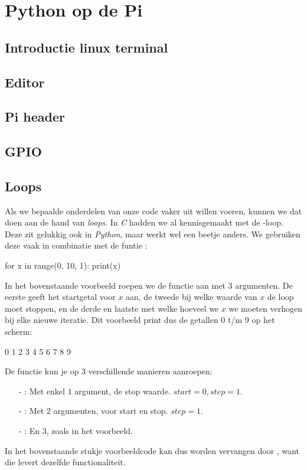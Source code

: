 \chapter{Python op de Pi}

\section{Introductie linux terminal}

\section{Editor}

\section{Pi header}

\section{GPIO}

\section{Loops}
Als we bepaalde onderdelen van onze code vaker uit willen voeren, kunnen we dat doen aan de hand van \textit{loops}. In \textit{C} hadden we al kennisgemaakt met de -loop. Deze zit gelukkig ook in \textit{Python}, maar werkt wel een beetje anders. We gebruiken deze vaak in combinatie met de funtie :
\begin{python}
for x in range(0, 10, 1):
	print(x)
\end{python}
In het bovenstaande voorbeeld roepen we de functie  aan met 3 argumenten. De eerste geeft het startgetal voor $x$ aan, de tweede bij welke waarde van $x$ de loop moet stoppen, en de derde en laatste met welke hoeveel we $x$ we moeten verhogen bij elke nieuwe iteratie. Dit voorbeeld print dus de getallen $0$ t/m $9$ op het scherm:
\begin{python}
0
1
2
3
4
5
6
7
8
9
\end{python}

\begin{remark}
De functie  kun je op $3$ verschillende manieren aanroepen:
\begin{enumerate}
\item[-] : Met enkel $1$ argument, de stop waarde. $start=0, step=1$.
\item[-] : Met $2$ argumenten, voor start en stop. $step=1$.
\item[-] : En $3$, zoals in het voorbeeld.
\end{enumerate}
In het bovenstaande stukje voorbeeldcode kan dus  worden vervangen door , want die levert dezelfde functionaliteit.
\end{remark}

